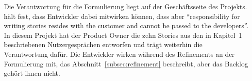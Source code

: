 %
%
%
%
%
Die Verantwortung für die Formulierung liegt auf der Geschäftsseite des Projekts.
\textcite[p.~81]{cohn2004} hält fest, dass Entwickler dabei mitwirken können, dass
aber \enquote{responsibility for writing stories resides with the customer and
cannot be passed to the developers}. In diesem Projekt hat der Product Owner die zehn
Stories aus den in Kapitel~1 beschriebenen Nutzergesprächen entworfen und trägt
weiterhin die Verantwortung dafür. Die Entwickler wirken während des Refinements
an der Formulierung mit, das Abschnitt~\ref{subsec:refinement} beschreibt, aber
das Backlog gehört ihnen nicht.


